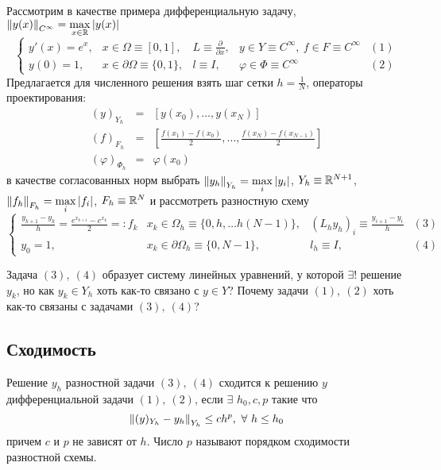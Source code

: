 \begin{example}
  Рассмотрим в качестве примера дифференциальную задачу, $\left\lVert y(x)\right\rVert_{C^{\infty}}=\max\limits_{x\in\mathbb{R}}\left\lvert y(x)\right\rvert$
  \[\left\{\begin{array}{ccccc}
      y'(x)=e^x, & x\in\Omega\equiv[0,1],           & L \equiv \frac{\partial}{\partial x}, & y\in Y\equiv C^{\infty},\ f\in F\equiv C^{\infty} & (1) \\
      y(0)=1,    & x\in\partial\Omega\equiv\{0,1\}, & l \equiv I,                           & \varphi\in\Phi\equiv C^{\infty}                   & (2)
    \end{array}\right.\]
  Предлагается для численного решения взять шаг сетки $h=\frac{1}{N}$,
  операторы проектирования:
  \[\begin{array}{ccc}
      (y)_{Y_h}          & = & [y(x_0),\ldots,y(x_N)]                                       \\
      (f)_{F_h}          & = & [\frac{f(x_1)-f(x_0)}{2},\ldots,\frac{f(x_N)-f(x_{N-1})}{2}] \\
      (\varphi)_{\Phi_h} & = & \varphi(x_0)
    \end{array}\]
  в качестве согласованных норм
  выбрать $\left\lVert y_h\right\rVert_{Y_h}=\max\limits_{i}|y_i|$, $Y_h\equiv \mathbb{R}^{N+1}$, $\left\lVert f_h\right\rVert_{F_h}=\max\limits_{i}|f_i|$, $F_h\equiv \mathbb{R}^{N}$ и рассмотреть разностную схему
  \[\left\{\begin{array}{cccccc}
      \frac{y_{k+1}-y_{k}}{h}=\frac{e^{x_{k+1}}-e^{x_k}}{2}=:f_k & x_k\in\Omega_h\equiv\{0,h,\ldots h(N-1)\}, & (L_hy_h)_i \equiv \frac{y_{i+1}-y_i}{h} & (3) \\
      y_0=1,                                                     & x_k\in\partial\Omega_h\equiv\{0,N-1\},     & l_h \equiv I,                           & (4)
    \end{array}\right.\]
\end{example}

Задача $(3),\ (4)$ образует систему линейных уравнений, у которой $\exists!$ решение $y_k$,
но как $y_k\in Y_h$ хоть как-то связано с $y\in Y$? Почему задачи $(1),\ (2)$ хоть как-то связаны с задачами $(3),\ (4)$?

\subsection*{Сходимость}

\begin{definition}
  Решение $y_h$ разностной задачи $(3),\ (4)$ сходится к
  решению $y$ дифференциальной задачи $(1),\ (2)$,
  если $\exists$ $h_0,c,p$ такие что
  \[\left\lVert(y)_{Y_h}-y_h \right\rVert_{Y_h} \leq ch^p,\ \forall\ h\leq h_0\]
  причем $c$ и $p$ не зависят от $h$. Число $p$ называют порядком сходимости
  разностной схемы.
\end{definition}

